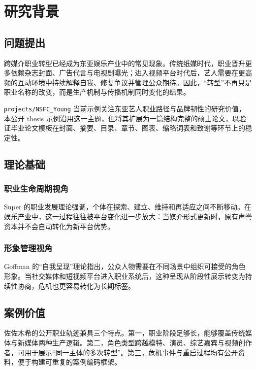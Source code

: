 \chapter{研究背景}

\section{问题提出}

跨媒介职业转型已经成为东亚娱乐产业中的常见现象。传统纸媒时代，职业晋升更多依赖杂志封面、广告代言与电视剧曝光；进入视频平台时代后，艺人需要在更高频的互动环境中持续解释自我、修复争议并管理公众期待\cite{Jenkins2006,Goffman1959}。因此，“转型”不再只是职业名称的改变，而是生产机制与传播机制同时变化的结果。

\texttt{projects/NSFC\_Young} 当前示例关注东亚艺人职业路径与品牌韧性的研究价值，本公开 thesis 示例沿用这一主题，但将其扩展为一篇结构完整的硕士论文，以验证毕业论文模板在封面、摘要、目录、章节、图表、缩略词表和致谢等环节上的稳定性。

\section{理论基础}

\subsection{职业生命周期视角}

Super 的职业发展理论强调，个体在探索、建立、维持和再适应之间不断移动\cite{Super1957}。在娱乐产业中，这一过程往往被平台变化进一步放大：当媒介形式更新时，原有声誉资本并不会自动转化为新平台优势。

\subsection{形象管理视角}

Goffman 的“自我呈现”理论指出，公众人物需要在不同场景中组织可接受的角色形象\cite{Goffman1959}。当社交媒体和短视频平台进入职业系统后，这种呈现从阶段性展示转变为持续性协商，危机也更容易转化为长期标签。

\section{案例价值}

佐佐木希的公开职业轨迹兼具三个特点。第一，职业阶段足够长，能够覆盖传统媒体与新媒体两种生产逻辑。第二，角色类型跨越模特、演员、综艺嘉宾与视频创作者，可用于展示“同一主体的多次转型”。第三，危机事件与重启过程均有公开资料，便于构建可重复的案例编码框架。

